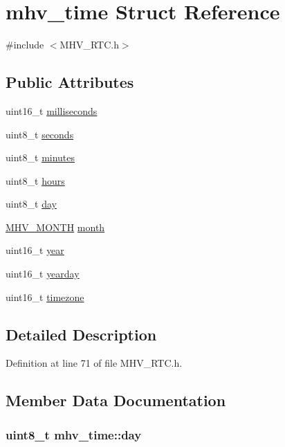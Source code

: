 \hypertarget{structmhv__time}{
\section{mhv\-\_\-time \-Struct \-Reference}
\label{structmhv__time}
}


{\ttfamily \#include $<$\-M\-H\-V\-\_\-\-R\-T\-C.\-h$>$}

\subsection*{\-Public \-Attributes}
\begin{DoxyCompactItemize}
\item 
uint16\-\_\-t \hyperlink{structmhv__time_a88f1e6b1d010c2f21b11bd335b1fae65}{milliseconds}
\item 
uint8\-\_\-t \hyperlink{structmhv__time_a4844293af0a3648391fb9335f2aa758c}{seconds}
\item 
uint8\-\_\-t \hyperlink{structmhv__time_a72c1e9925d2d3de254c6550c0b309347}{minutes}
\item 
uint8\-\_\-t \hyperlink{structmhv__time_a86216ab6b58bede2c74b8b38745c81f7}{hours}
\item 
uint8\-\_\-t \hyperlink{structmhv__time_aa20dafe05aae315fff313d53656c6318}{day}
\item 
\hyperlink{_m_h_v___r_t_c_8h_a98c5fb7fa4cf35056e932e294af7cbb5}{\-M\-H\-V\-\_\-\-M\-O\-N\-T\-H} \hyperlink{structmhv__time_a832c57e459789022fb39b7c704a3e926}{month}
\item 
uint16\-\_\-t \hyperlink{structmhv__time_ab5441551ca64fde709afdc98fa5c851e}{year}
\item 
uint16\-\_\-t \hyperlink{structmhv__time_aa5e9d8969550c007c40f6b2dd404d3d6}{yearday}
\item 
uint16\-\_\-t \hyperlink{structmhv__time_abe9ad1b2bfd43e6688c07367a279c50b}{timezone}
\end{DoxyCompactItemize}


\subsection{\-Detailed \-Description}


\-Definition at line 71 of file \-M\-H\-V\-\_\-\-R\-T\-C.\-h.



\subsection{\-Member \-Data \-Documentation}
\hypertarget{structmhv__time_aa20dafe05aae315fff313d53656c6318}{
\subsubsection[{day}]{\setlength{\rightskip}{0pt plus 5cm}uint8\-\_\-t {\bf mhv\-\_\-time\-::day}}}
\label{structmhv__time_aa20dafe05aae315fff313d53656c6318}


